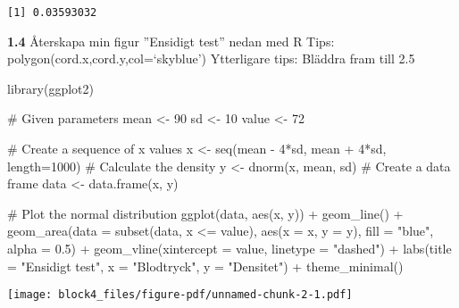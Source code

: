 \documentclass[
  letterpaper,
  DIV=11,
  numbers=noendperiod]{scrartcl}
\newenvironment{Shaded}{\begin{snugshade}}{\end{snugshade}}
\newcommand{\AttributeTok}[1]{\textcolor[rgb]{0.40,0.45,0.13}{#1}}
\newcommand{\CommentTok}[1]{\textcolor[rgb]{0.37,0.37,0.37}{#1}}
\newcommand{\DecValTok}[1]{\textcolor[rgb]{0.68,0.00,0.00}{#1}}
\newcommand{\FloatTok}[1]{\textcolor[rgb]{0.68,0.00,0.00}{#1}}
\newcommand{\FunctionTok}[1]{\textcolor[rgb]{0.28,0.35,0.67}{#1}}
\newcommand{\NormalTok}[1]{\textcolor[rgb]{0.00,0.23,0.31}{#1}}
\newcommand{\OtherTok}[1]{\textcolor[rgb]{0.00,0.23,0.31}{#1}}
\newcommand{\SpecialCharTok}[1]{\textcolor[rgb]{0.37,0.37,0.37}{#1}}
\newcommand{\StringTok}[1]{\textcolor[rgb]{0.13,0.47,0.30}{#1}}
\begin{document}
\begin{verbatim}
[1] 0.03593032
\end{verbatim}

\textbf{1.4} Återskapa min figur ''Ensidigt test'' nedan med R Tips:
polygon(cord.x,cord.y,col=`skyblue') Ytterligare tips: Bläddra fram till
2.5

\begin{Shaded}
\begin{Highlighting}[]
\FunctionTok{library}\NormalTok{(ggplot2)}

\CommentTok{\# Given parameters}
\NormalTok{mean }\OtherTok{\textless{}{-}} \DecValTok{90}
\NormalTok{sd }\OtherTok{\textless{}{-}} \DecValTok{10}
\NormalTok{value }\OtherTok{\textless{}{-}} \DecValTok{72}

\CommentTok{\# Create a sequence of x values}
\NormalTok{x }\OtherTok{\textless{}{-}} \FunctionTok{seq}\NormalTok{(mean }\SpecialCharTok{{-}} \DecValTok{4}\SpecialCharTok{*}\NormalTok{sd, mean }\SpecialCharTok{+} \DecValTok{4}\SpecialCharTok{*}\NormalTok{sd, }\AttributeTok{length=}\DecValTok{1000}\NormalTok{)}
\CommentTok{\# Calculate the density}
\NormalTok{y }\OtherTok{\textless{}{-}} \FunctionTok{dnorm}\NormalTok{(x, mean, sd)}
\CommentTok{\# Create a data frame}
\NormalTok{data }\OtherTok{\textless{}{-}} \FunctionTok{data.frame}\NormalTok{(x, y)}

\CommentTok{\# Plot the normal distribution}
\FunctionTok{ggplot}\NormalTok{(data, }\FunctionTok{aes}\NormalTok{(x, y)) }\SpecialCharTok{+}
  \FunctionTok{geom\_line}\NormalTok{() }\SpecialCharTok{+}
  \FunctionTok{geom\_area}\NormalTok{(}\AttributeTok{data =} \FunctionTok{subset}\NormalTok{(data, x }\SpecialCharTok{\textless{}=}\NormalTok{ value), }\FunctionTok{aes}\NormalTok{(}\AttributeTok{x =}\NormalTok{ x, }\AttributeTok{y =}\NormalTok{ y), }\AttributeTok{fill =} \StringTok{"blue"}\NormalTok{, }\AttributeTok{alpha =} \FloatTok{0.5}\NormalTok{) }\SpecialCharTok{+}
  \FunctionTok{geom\_vline}\NormalTok{(}\AttributeTok{xintercept =}\NormalTok{ value, }\AttributeTok{linetype =} \StringTok{"dashed"}\NormalTok{) }\SpecialCharTok{+}
  \FunctionTok{labs}\NormalTok{(}\AttributeTok{title =} \StringTok{"Ensidigt test"}\NormalTok{, }\AttributeTok{x =} \StringTok{"Blodtryck"}\NormalTok{, }\AttributeTok{y =} \StringTok{"Densitet"}\NormalTok{) }\SpecialCharTok{+}
  \FunctionTok{theme\_minimal}\NormalTok{()}
\end{Highlighting}
\end{Shaded}

\texttt{[image: block4\_files/figure-pdf/unnamed-chunk-2-1.pdf]}
\end{document}
